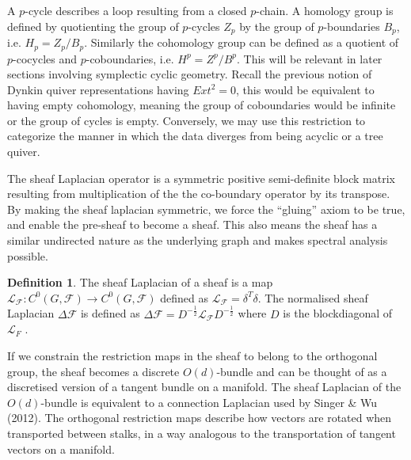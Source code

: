 \documentclass{article}
\theoremstyle{definition}
\newtheorem{definition}{Definition}[section]
\begin{document}
A $p$-cycle describes a loop resulting from a closed $p$-chain. A homology group is defined by quotienting the group of $p$-cycles $Z_p$ by the group of $p$-boundaries $B_p$, i.e. $H_p = Z_p / B_p$. Similarly the cohomology group can be defined as a quotient of $p$-cocycles and $p$-coboundaries, i.e. $H^p = Z^p / B^p$. This will be relevant in later sections involving symplectic cyclic geometry.
Recall the previous notion of Dynkin quiver representations having $Ext^2=0$, this would be equivalent to having empty cohomology, meaning the group of coboundaries would be infinite or the group of cycles is empty. Conversely, we may use this restriction to categorize the manner in which the data diverges from being acyclic or a tree quiver.



The sheaf Laplacian operator is a symmetric positive semi-definite block matrix resulting from multiplication of the the co-boundary operator by its transpose. By making the sheaf laplacian symmetric, we force the ``gluing'' axiom to be true, and enable the pre-sheaf to become a sheaf. This also means the sheaf has a similar undirected nature as the underlying graph and makes spectral analysis possible.

\begin{definition}
    The sheaf Laplacian of a sheaf is a map $\mathcal{L}_\mathcal{F} : C^0(G, \mathcal{F}) \to C^0(G, \mathcal{F})$ defined as $\mathcal{L}_\mathcal{F} = \delta^T \delta$. The normalised sheaf Laplacian $\Delta \mathcal{F}$  is defined as $ \Delta \mathcal{F} = D^{-\frac{1}{2}} \mathcal{L}_\mathcal{F} D^{-\frac{1}{2}}$ where $D$ is the blockdiagonal of $\mathcal{L}_{F}$ .
\end{definition}  

If we constrain the restriction maps in the sheaf to belong to the orthogonal group, the sheaf becomes a discrete $O(d)$-bundle and can be thought of as a discretised version of a tangent bundle on a manifold. The sheaf Laplacian of the $O(d)$-bundle is equivalent to a connection Laplacian used by Singer \& Wu (2012). The orthogonal restriction maps describe how vectors are rotated when transported between stalks, in a way analogous to the transportation of tangent vectors on a manifold.
\end{document}
